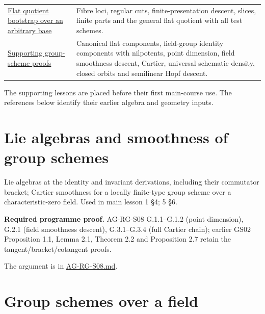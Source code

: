 \documentclass[11pt,a4paper,openany]{report}
\begin{document}
{\begin{longtable}[]{@{}
  >{\raggedright\arraybackslash}p{}
  >{\raggedright\arraybackslash}p{}@{}}
\href{https://github.com/KokunoYumeto/open-math-courses/blob/main/docs/courses/AG-RG/AG-RG-S07.md}{Flat quotient bootstrap over an arbitrary base} & Fibre loci, regular cuts, finite-presentation descent, slices, finite parts and the general flat quotient with all test schemes. \\
\href{https://github.com/KokunoYumeto/open-math-courses/blob/main/docs/courses/AG-RG/AG-RG-S08.md}{Supporting group-scheme proofs} & Canonical flat components, field-group identity components with nilpotents, point dimension, field smoothness descent, Cartier, universal schematic density, closed orbits and semilinear Hopf descent. \\
\end{longtable}
}

The supporting lessons are placed before their first main-course use. The references below identify their earlier algebra and geometry inputs.

\section{Lie algebras and smoothness of group schemes}\label{lie-algebras-and-smoothness-of-group-schemes}

Lie algebras at the identity and invariant derivations, including their commutator bracket; Cartier smoothness for a locally finite-type group scheme over a characteristic-zero field. Used in main lesson 1 §4; 5 §6.

\textbf{Required programme proof.} AG-RG-S08 G.1.1--G.1.2 (point dimension), G.2.1 (field smoothness descent), G.3.1--G.3.4 (full Cartier chain); earlier GS02 Proposition 1.1, Lemma 2.1, Theorem 2.2 and Proposition 2.7 retain the tangent/bracket/cotangent proofs.

The argument is in \href{https://github.com/KokunoYumeto/open-math-courses/blob/main/docs/courses/AG-RG/AG-RG-S08.md}{AG-RG-S08.md}.

\section{Group schemes over a field}\label{group-schemes-over-a-field}
\end{document}
